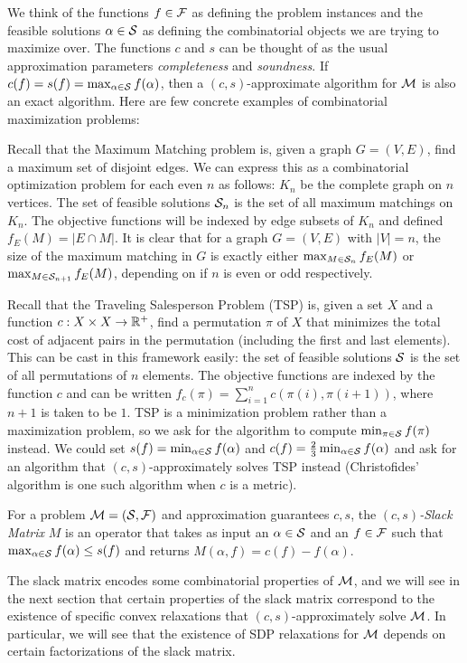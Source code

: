 We think of the functions $f \in \mathcal F$ as defining the problem instances and the feasible solutions $\alpha \in \mathcal S$ as defining the combinatorial objects we are
trying to maximize over. The functions $c$ and $s$ can be thought of as the usual approximation parameters \emph{completeness} and \emph{soundness}. If $c(f) = s(f) = \max_{\alpha \in \mathcal S} f(\alpha)$, then a $(c,s)$-approximate algorithm for $\mathcal M$ is also an exact algorithm. Here are few concrete examples of combinatorial maximization problems:
\begin{example}\label{ex:matching}
    Recall that the Maximum Matching problem is, given a graph $G = (V,E)$, find a maximum set of disjoint edges. We can express this as a combinatorial optimization problem for each even $n$ as follows: $K_n$ be the complete graph on $n$ vertices. The set of feasible solutions $\mathcal S_n$ is the set of all maximum matchings on $K_n$. The objective functions will be indexed by edge subsets of $K_n$ and defined $f_E(M) = |E \cap M|$. It is clear that for a graph $G = (V, E)$ with $|V| = n$, the size of the maximum matching in $G$ is exactly either $\max_{M \in \mathcal S_n} f_E(M)$ or $\max_{M \in \mathcal S_{n+1}} f_E(M)$, depending on if $n$ is even or odd respectively.
\end{example}
\begin{example}
Recall that the Traveling Salesperson Problem (\textsc{TSP}) is, given a set $X$ and a function $c: X\times X \rightarrow \mathbb R^+$, find a permutation $\pi$ of $X$ that minimizes the total cost of adjacent pairs in the permutation (including the first and last elements). This can be cast in this framework easily: the set of feasible solutions $\mathcal S$ is the set of all permutations of $n$ elements. The objective functions are indexed by the function $c$ and can be written $f_c(\pi) = \sum_{i=1}^n c(\pi(i),\pi(i+1))$, where $n+1$ is taken to be $1$. TSP is a minimization problem rather than a maximization problem, so we ask for the algorithm to compute $\min_{\pi \in \mathcal S} f(\pi)$ instead. We could set $s(f) = \min_{\alpha \in \mathcal S} f(\alpha)$ and $c(f) = \frac{2}{3}\min_{\alpha \in \mathcal S} f(\alpha)$ and ask for an algorithm that $(c,s)$-approximately solves \textsc{TSP} instead (Christofides' algorithm \cite{Chri76} is one such algorithm when $c$ is a metric).
\end{example}
\begin{definition}
    For a problem $\mathcal M = (\mathcal S, \mathcal F)$ and approximation guarantees $c,s$, the \emph{$(c,s)$-Slack Matrix} $M$ is an operator that takes as input an $\alpha \in \mathcal S$ and an $f \in \mathcal F$ such that $\max_{\alpha \in \mathcal S} f(\alpha) \leq s(f)$ and returns $M(\alpha,f) = c(f) - f(\alpha)$.
\end{definition}
The slack matrix encodes some combinatorial properties of $\mathcal M$, and we will see in the next section that certain properties of the slack matrix correspond to the existence of specific convex relaxations that $(c,s)$-approximately solve $\mathcal M$. In particular, we will see that the existence of SDP relaxations for $\mathcal M$ depends on certain factorizations of the slack matrix.

